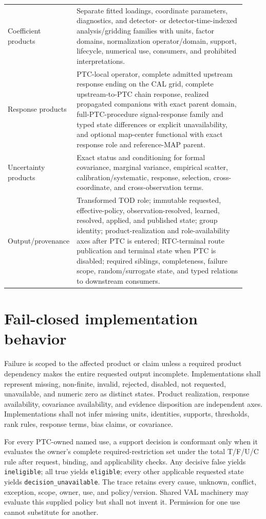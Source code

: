 \documentclass[10pt]{article}
\begin{document}
\begin{longtable}{>{\raggedright\arraybackslash}p{0.21\linewidth}
                  >{\raggedright\arraybackslash}p{0.71\linewidth}}
Coefficient products & Separate fitted loadings, coordinate parameters, diagnostics, and detector- or detector-time-indexed analysis/gridding families with units, factor domains, normalization operator/domain, support, lifecycle, numerical use, consumers, and prohibited interpretations.\\
Response products & PTC-local operator, complete admitted upstream response ending on the CAL grid, complete upstream-to-PTC chain response, realized propagated companions with exact parent domain, full-PTC-procedure signal-response family and typed state differences or explicit unavailability, and optional map-center functional with exact response role and reference-MAP parent.\\
Uncertainty products & Exact status and conditioning for formal covariance, marginal variance, empirical scatter, calibration/systematic, response, selection, cross-coordinate, and cross-observation terms.\\
Output/provenance & Transformed TOD role; immutable requested, effective-policy, observation-resolved, learned, resolved, applied, and published state; group identity; product-realization and role-availability axes after PTC is entered; RTC-terminal route publication and terminal state when PTC is disabled; required siblings, completeness, failure scope, random/surrogate state, and typed relations to downstream consumers.\\
\bottomrule
\end{longtable}

\section{Fail-closed implementation behavior}
\label{sec:engineering-failure}

Failure is scoped to the affected product or claim unless a required product
dependency makes the entire requested output incomplete. Implementations shall
represent missing, non-finite, invalid, rejected, disabled, not requested,
unavailable, and numeric zero as distinct states. Product realization,
response availability, covariance availability, and evidence disposition are
independent axes. Implementations shall not infer missing units, identities,
supports, thresholds, rank rules, response terms, bias claims, or covariance.

For every PTC-owned named use, a support decision is conformant only when it
evaluates the owner's complete required-restriction set under the total
T/F/U/C rule after request, binding, and applicability checks. Any decisive
false yields \texttt{ineligible}; all true yields \texttt{eligible}; every
other applicable requested state yields \texttt{decision\_unavailable}. The
trace retains every cause, unknown, conflict, exception, scope, owner, use,
and policy/version. Shared VAL machinery may evaluate this supplied policy
but shall not invent it. Permission for one use cannot substitute for another.
\end{document}
